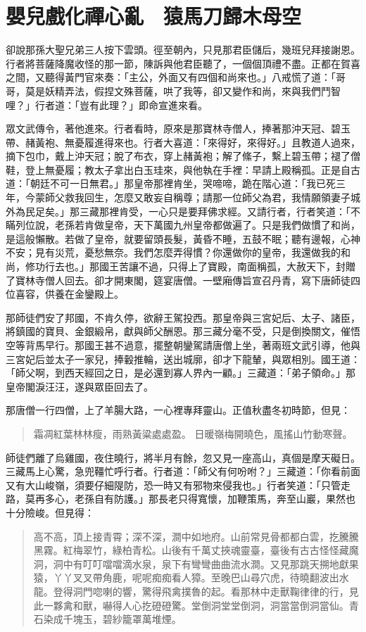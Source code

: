 
\chapter{嬰兒戲化禪心亂　猿馬刀歸木母空}

卻說那孫大聖兄弟三人按下雲頭。徑至朝內，只見那君臣儲后，幾班兒拜接謝恩。行者將菩薩降魔收怪的那一節，陳訴與他君臣聽了，一個個頂禮不盡。正都在賀喜之間，又聽得黃門官來奏：「主公，外面又有四個和尚來也。」八戒慌了道：「哥哥，莫是妖精弄法，假捏文殊菩薩，哄了我等，卻又變作和尚，來與我們鬥智哩？」行者道：「豈有此理？」即命宣進來看。

眾文武傳令，著他進來。行者看時，原來是那寶林寺僧人，捧著那沖天冠、碧玉帶、赭黃袍、無憂履進得來也。行者大喜道：「來得好，來得好。」且教道人過來，摘下包巾，戴上沖天冠；脫了布衣，穿上赭黃袍；解了絛子，繫上碧玉帶；褪了僧鞋，登上無憂履；教太子拿出白玉珪來，與他執在手裡：早請上殿稱孤。正是自古道：「朝廷不可一日無君。」那皇帝那裡肯坐，哭啼啼，跪在階心道：「我已死三年，今蒙師父救我回生，怎麼又敢妄自稱尊；請那一位師父為君，我情願領妻子城外為民足矣。」那三藏那裡肯受，一心只是要拜佛求經。又請行者，行者笑道：「不瞞列位說，老孫若肯做皇帝，天下萬國九州皇帝都做遍了。只是我們做慣了和尚，是這般懶散。若做了皇帝，就要留頭長髮，黃昏不睡，五鼓不眠；聽有邊報，心神不安；見有災荒，憂愁無奈。我們怎麼弄得慣？你還做你的皇帝，我還做我的和尚，修功行去也。」那國王苦讓不過，只得上了寶殿，南面稱孤，大赦天下，封贈了寶林寺僧人回去。卻才開東閣，筵宴唐僧。一壁廂傳旨宣召丹青，寫下唐師徒四位喜容，供養在金鑾殿上。

那師徒們安了邦國，不肯久停，欲辭王駕投西。那皇帝與三宮妃后、太子、諸臣，將鎮國的寶貝、金銀緞帛，獻與師父酬恩。那三藏分毫不受，只是倒換關文，催悟空等背馬早行。那國王甚不過意，擺整朝鑾駕請唐僧上坐，著兩班文武引導，他與三宮妃后並太子一家兒，捧轂推輪，送出城廓，卻才下龍輦，與眾相別。國王道：「師父啊，到西天經回之日，是必還到寡人界內一顧。」三藏道：「弟子領命。」那皇帝閣淚汪汪，遂與眾臣回去了。

那唐僧一行四僧，上了羊腸大路，一心裡專拜靈山。正值秋盡冬初時節，但見：
\begin{quote}
霜凋紅葉林林瘦，雨熟黃粱處處盈。
日暖嶺梅開曉色，風搖山竹動寒聲。
\end{quote}

師徒們離了烏雞國，夜住曉行，將半月有餘，忽又見一座高山，真個是摩天礙日。三藏馬上心驚，急兜韁忙呼行者。行者道：「師父有何吩咐？」三藏道：「你看前面又有大山峻嶺，須要仔細隄防，恐一時又有邪物來侵我也。」行者笑道：「只管走路，莫再多心，老孫自有防護。」那長老只得寬懷，加鞭策馬，奔至山巖，果然也十分險峻。但見得：
\begin{quote}
高不高，頂上接青霄；深不深，澗中如地府。山前常見骨都都白雲，扢騰騰黑霧。紅梅翠竹，綠柏青松。山後有千萬丈挾魂靈臺，臺後有古古怪怪藏魔洞，洞中有叮叮噹噹滴水泉，泉下有彎彎曲曲流水澗。又見那跳天搠地獻果猿，丫丫叉叉帶角鹿，呢呢痴痴看人獐。至晚巴山尋穴虎，待曉翻波出水龍。登得洞門唿喇的響，驚得飛禽撲魯的起。看那林中走獸鞠律律的行，見此一夥禽和獸，嚇得人心扢磴磴驚。堂倒洞堂堂倒洞，洞當當倒洞當仙。青石染成千塊玉，碧紗籠罩萬堆煙。
\end{quote}

